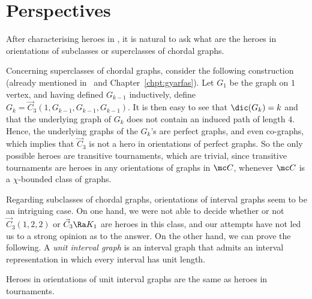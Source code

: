 \section{Perspectives}

After characterising heroes in \ocgs, it is natural to ask what are the heroes in orientations of subclasses or superclasses of chordal graphs. 

Concerning superclasses of chordal graphs, consider the following construction (already mentioned in~\cite{ACN21} and Chapter~\ref{chpt:gyarfas}). Let $G_1$ be the graph on $1$ vertex, and having defined $G_{k-1}$ inductively, define $G_k = \vec C_{3}(1, G_{k-1}, G_{k-1}, G_{k-1})$. %
It is then easy to see that $\dic(G_k)=k$ and that the underlying graph of $G_k$ does not contain an induced path of length $4$. Hence, the underlying graphs of the $G_k$'s are perfect graphs, and even co-graphs, which implies that $\vec C_3$ is not a hero in orientations of perfect graphs. So the only possible heroes are transitive tournaments, which are trivial, since transitive tournaments are heroes in any orientations of graphs in $\mc C$, whenever $\mc C$ is a $\chi$-bounded class of graphs.

Regarding subclasses of chordal graphs, orientations of interval graphs seem to be an intriguing case. On one hand, we were not able to decide whether or not $\vec C_{3}(1,2,2)$ or $\vec C_3 \Ra K_1$ are heroes in this class,  and our attempts have not led us to a strong opinion as to the answer. 
On the other hand, we can prove the following. A \emph{unit interval graph} is an interval graph that admits an interval representation in which every interval has unit length. 

\begin{theorem}
Heroes in orientations of unit interval graphs are the same as heroes in tournaments.
\end{theorem}

